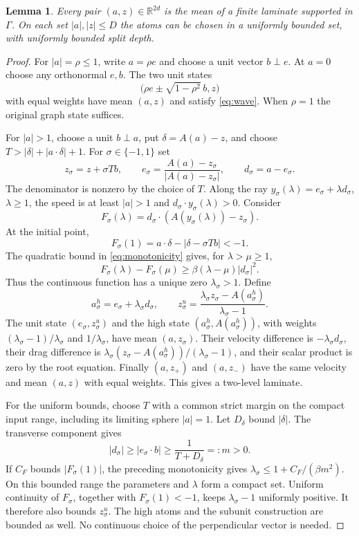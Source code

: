 \documentclass[11pt]{article}
\newtheorem{lemma}[lemma]{Lemma}
\theoremstyle{remark}
\newcommand{\R}{\mathbb R}
\begin{document}
\begin{lemma}\label{lem:hull}
Every pair $(a,z)\in\R^{2d}$ is the mean of a finite laminate
supported in $\Gamma$. On each set $|a|,|z|\le D$ the atoms can
be chosen in a uniformly bounded set, with uniformly bounded split depth.
\end{lemma}
\begin{proof}
For $|a|=\rho\le1$, write $a=\rho e$ and choose a unit vector
$b\perp e$. At $a=0$ choose any orthonormal $e,b$.
The two unit states
\[
 \big(\rho e\pm\sqrt{1-\rho^2}\,b,z\big)
\]
with equal weights have mean $(a,z)$ and satisfy \eqref{eq:wave}.
When $\rho=1$ the original graph state suffices.

For $|a|>1$, choose a unit $b\perp a$, put $\delta=A(a)-z$,
and choose $T>|\delta|+|a\cdot\delta|+1$. For $\sigma\in\{-1,1\}$ set
\[
 z_\sigma=z+\sigma Tb,\qquad
 e_\sigma=\frac{A(a)-z_\sigma}{|A(a)-z_\sigma|},\qquad
 d_\sigma=a-e_\sigma.
\]
The denominator is nonzero by the choice of $T$. Along the ray
$y_\sigma(\lambda)=e_\sigma+\lambda d_\sigma$, $\lambda\ge1$,
the speed is at least $|a|>1$ and $d_\sigma\cdot y_\sigma(\lambda)>0$.
Consider
\[
 F_\sigma(\lambda)=d_\sigma\cdot(A(y_\sigma(\lambda))-z_\sigma).
\]
At the initial point,
\[
 F_\sigma(1)=a\cdot\delta-|\delta-\sigma Tb|<-1.
\]
The quadratic bound in \eqref{eq:monotonicity} gives, for $\lambda>\mu\ge1$,
\[
 F_\sigma(\lambda)-F_\sigma(\mu)
 \ge\beta(\lambda-\mu)|d_\sigma|^2.
\]
Thus the continuous function has a unique zero $\lambda_\sigma>1$.
Define
\[
 a_\sigma^h=e_\sigma+\lambda_\sigma d_\sigma,\qquad
 z_\sigma^u=
 \frac{\lambda_\sigma z_\sigma-A(a_\sigma^h)}{\lambda_\sigma-1}.
\]
The unit state $(e_\sigma,z_\sigma^u)$ and the high state
$(a_\sigma^h,A(a_\sigma^h))$, with weights
$(\lambda_\sigma-1)/\lambda_\sigma$ and $1/\lambda_\sigma$,
have mean $(a,z_\sigma)$. Their velocity difference is
$-\lambda_\sigma d_\sigma$, their drag difference is
$\lambda_\sigma(z_\sigma-A(a_\sigma^h))/(\lambda_\sigma-1)$,
and their scalar product is zero by the root equation.
Finally $(a,z_+)$ and $(a,z_-)$ have the same velocity and mean
$(a,z)$ with equal weights. This gives a two-level laminate.

For the uniform bounds, choose $T$ with a common strict margin on
the compact input range, including its limiting sphere $|a|=1$.
Let $D_\delta$ bound $|\delta|$. The transverse component gives
\[
 |d_\sigma|\ge|e_\sigma\cdot b|
 \ge\frac1{T+D_\delta}=:m>0.
\]
If $C_F$ bounds $|F_\sigma(1)|$, the preceding monotonicity gives
$\lambda_\sigma\le1+C_F/(\beta m^2)$.
On this bounded range the parameters and $\lambda$ form a compact
set. Uniform continuity of $F_\sigma$, together with
$F_\sigma(1)<-1$, keeps $\lambda_\sigma-1$ uniformly positive.
It therefore also bounds $z_\sigma^u$. The high atoms and the
subunit construction are bounded as well. No continuous choice of the
perpendicular vector is needed.
\end{proof}
\end{document}
